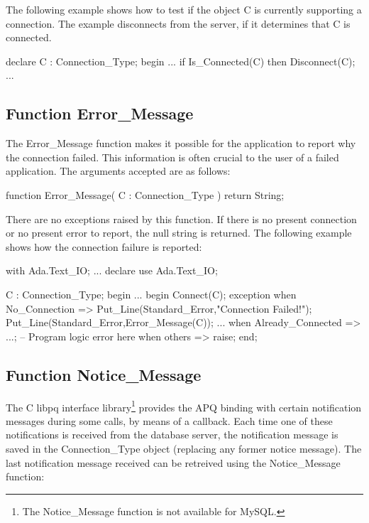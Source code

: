 \documentclass[english,letterpaper]{book}
\begin{document}
The following example shows how to test if the object C is currently
supporting a connection. The example disconnects from the server,
if it determines that C is connected.

\begin{Example}
declare
   C : Connection_Type;
begin
   ...
   if Is_Connected(C) then
      Disconnect(C);
      ...
\end{Example}

\subsection{Function Error\_Message}

The Error\_Message function makes it possible for the application
to report why the connection failed. This information is often crucial
to the user of a failed application. The arguments accepted are as
follows:

\begin{Code}
function Error_Message(
   C : Connection_Type
) return String;
\end{Code}

There are no exceptions raised by this function. If there is no present
connection or no present error to report, the null string is returned.
The following example shows how the connection failure is reported:

\begin{Example}
with Ada.Text_IO;
...
declare
   use Ada.Text_IO;

   C : Connection_Type;
begin
   ...
   begin
      Connect(C);
   exception
      when No_Connection =>
         Put_Line(Standard_Error,"Connection Failed!");
         Put_Line(Standard_Error,Error_Message(C));
         ...
      when Already_Connected =>
         ...;  -- Program logic error here
      when others =>
         raise;
   end;
\end{Example}

\subsection{Function Notice\_Message\label{Function Notice_Message}}

The C libpq interface library\footnote{The Notice\_Message function is
not available for MySQL.} provides the APQ binding with certain
notification messages during some calls, by means of a callback. Each
time one of these notifications is received from the database server,
the notification message is saved in the Connection\_Type object
(replacing any former notice message). The last notification message
received can be retreived using the Notice\_Message function:
\end{document}
